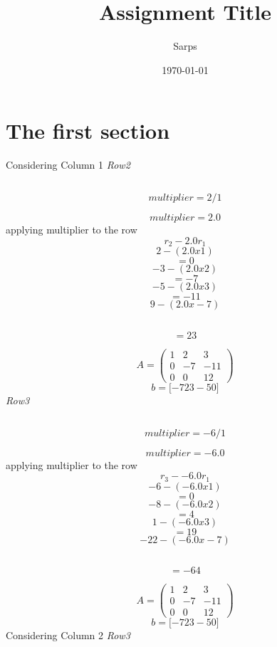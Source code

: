 \documentclass{article}%
\title{Assignment Title}%
\author{Sarps}%
\date{\today}%
\begin{document}
%
\normalsize%
\maketitle%
\section{The first section}%
\label{sec:The first section}%
Considering Column 1%
\textit{Row2}%
\subsection{	}%
\label{subsec:}%
\[%
	multiplier = 2  /  1%
\]

%
\[%
		multiplier = 2.0%
\]%
\newline%
%
	applying multiplier to the row%
\[%
		r_2  {-}  2.0 r_1%
\]%
\[%
		 2  {-} ( 2.0  x  1 )%
\]%
\[%
			 =  0%
\]%
\[%
		 {-}3  {-} ( 2.0  x  2 )%
\]%
\[%
			 =  {-}7%
\]%
\[%
		 {-}5  {-} ( 2.0  x  3 )%
\]%
\[%
			 =  {-}11%
\]%
\[%
		 9  {-} ( 2.0  x  {-}7 )%
\]%
\subsection{			}%
\label{subsec:}%
\[%
= 23%
\]

%
\[%
A = \begin{pmatrix}%
1&2&3\\%
0&-7&-11\\%
0&0&12%
\end{pmatrix}%
\]%
\[%
b = {[} {-}7  23 {-}50{]}%
\]%
\newline%
%
\textit{Row3}%
\subsection{	}%
\label{subsec:}%
\[%
	multiplier = {-}6  /  1%
\]

%
\[%
		multiplier = {-}6.0%
\]%
\newline%
%
	applying multiplier to the row%
\[%
		r_3  {-}  {-}6.0 r_1%
\]%
\[%
		 {-}6  {-} ( {-}6.0  x  1 )%
\]%
\[%
			 =  0%
\]%
\[%
		 {-}8  {-} ( {-}6.0  x  2 )%
\]%
\[%
			 =  4%
\]%
\[%
		 1  {-} ( {-}6.0  x  3 )%
\]%
\[%
			 =  19%
\]%
\[%
		 {-}22  {-} ( {-}6.0  x  {-}7 )%
\]%
\subsection{			}%
\label{subsec:}%
\[%
= {-}64%
\]

%
\[%
A = \begin{pmatrix}%
1&2&3\\%
0&-7&-11\\%
0&0&12%
\end{pmatrix}%
\]%
\[%
b = {[} {-}7  23 {-}50{]}%
\]%
\newline%
%
Considering Column 2%
\textit{Row3}%
\end{document}
